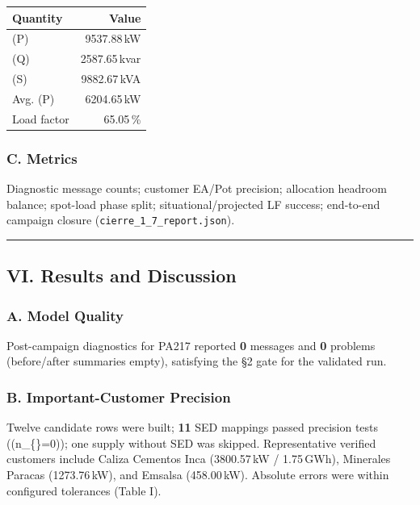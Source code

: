 \documentclass[
  11pt,
]{article}
\newcounter{none} %
\begin{document}
{\def\LTcaptype{none} %
\begin{longtable}[]{@{}lr@{}}
\toprule\noalign{}
Quantity & Value \\
\midrule\noalign{}
\endhead
\bottomrule\noalign{}
\endlastfoot
(P) & 9537.88\,kW \\
(Q) & 2587.65\,kvar \\
(S) & 9882.67\,kVA \\
Avg. (P) & 6204.65\,kW \\
Load factor & 65.05\,\% \\
\end{longtable}
}

\subsubsection{C. Metrics}\label{c.-metrics}

Diagnostic message counts; customer EA/Pot precision; allocation
headroom balance; spot-load phase split; situational/projected LF
success; end-to-end campaign closure
(\texttt{cierre\_1\_7\_report.json}).

\begin{center}\rule{0.5\linewidth}{0.5pt}\end{center}

\subsection{VI. Results and
Discussion}\label{vi.-results-and-discussion}

\subsubsection{A. Model Quality}\label{a.-model-quality}

Post-campaign diagnostics for PA217 reported \textbf{0} messages and
\textbf{0} problems (before/after summaries empty), satisfying the §2
gate for the validated run.

\subsubsection{B. Important-Customer
Precision}\label{b.-important-customer-precision}

Twelve candidate rows were built; \textbf{11} SED mappings passed
precision tests ((n\_\{\}=0)); one supply without SED was
skipped. Representative verified customers include Caliza Cementos Inca
(3800.57\,kW / 1.75\,GWh), Minerales Paracas (1273.76\,kW), and Emsalsa
(458.00\,kW). Absolute errors were within configured tolerances (Table
I).
\end{document}
